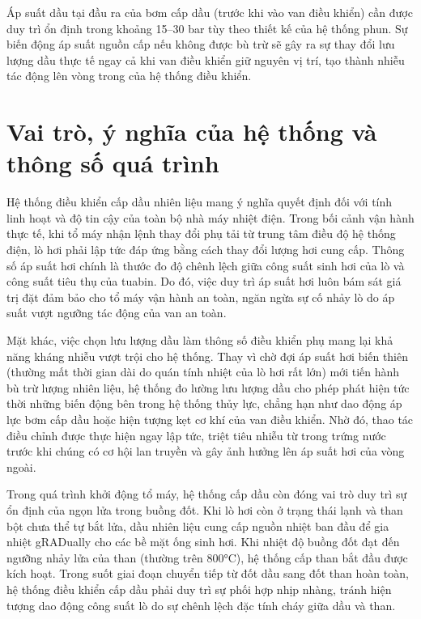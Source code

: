 \documentclass[../main.tex]{subfiles}
\begin{document}
Áp suất dầu tại đầu ra của bơm cấp dầu (trước khi vào van điều khiển) cần được duy trì ổn định trong khoảng 15--30 bar tùy theo thiết kế của hệ thống phun. Sự biến động áp suất nguồn cấp nếu không được bù trừ sẽ gây ra sự thay đổi lưu lượng dầu thực tế ngay cả khi van điều khiển giữ nguyên vị trí, tạo thành nhiễu tác động lên vòng trong của hệ thống điều khiển.

\section{Vai trò, ý nghĩa của hệ thống và thông số quá trình}

Hệ thống điều khiển cấp dầu nhiên liệu mang ý nghĩa quyết định đối với tính linh hoạt và độ tin cậy của toàn bộ nhà máy nhiệt điện. Trong bối cảnh vận hành thực tế, khi tổ máy nhận lệnh thay đổi phụ tải từ trung tâm điều độ hệ thống điện, lò hơi phải lập tức đáp ứng bằng cách thay đổi lượng hơi cung cấp. Thông số áp suất hơi chính là thước đo độ chênh lệch giữa công suất sinh hơi của lò và công suất tiêu thụ của tuabin. Do đó, việc duy trì áp suất hơi luôn bám sát giá trị đặt đảm bảo cho tổ máy vận hành an toàn, ngăn ngừa sự cố nhảy lò do áp suất vượt ngưỡng tác động của van an toàn.

Mặt khác, việc chọn lưu lượng dầu làm thông số điều khiển phụ mang lại khả năng kháng nhiễu vượt trội cho hệ thống. Thay vì chờ đợi áp suất hơi biến thiên (thường mất thời gian dài do quán tính nhiệt của lò hơi rất lớn) mới tiến hành bù trừ lượng nhiên liệu, hệ thống đo lường lưu lượng dầu cho phép phát hiện tức thời những biến động bên trong hệ thống thủy lực, chẳng hạn như dao động áp lực bơm cấp dầu hoặc hiện tượng kẹt cơ khí của van điều khiển. Nhờ đó, thao tác điều chỉnh được thực hiện ngay lập tức, triệt tiêu nhiễu từ trong trứng nước trước khi chúng có cơ hội lan truyền và gây ảnh hưởng lên áp suất hơi của vòng ngoài.

Trong quá trình khởi động tổ máy, hệ thống cấp dầu còn đóng vai trò duy trì sự ổn định của ngọn lửa trong buồng đốt. Khi lò hơi còn ở trạng thái lạnh và than bột chưa thể tự bắt lửa, dầu nhiên liệu cung cấp nguồn nhiệt ban đầu để gia nhiệt gRADually cho các bề mặt ống sinh hơi. Khi nhiệt độ buồng đốt đạt đến ngưỡng nhảy lửa của than (thường trên 800°C), hệ thống cấp than bắt đầu được kích hoạt. Trong suốt giai đoạn chuyển tiếp từ đốt dầu sang đốt than hoàn toàn, hệ thống điều khiển cấp dầu phải duy trì sự phối hợp nhịp nhàng, tránh hiện tượng dao động công suất lò do sự chênh lệch đặc tính cháy giữa dầu và than.
\end{document}
